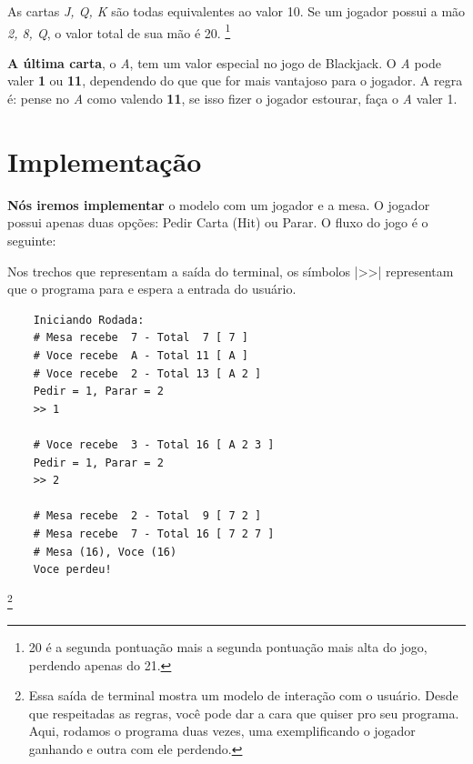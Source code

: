 \documentclass[12pt]{article}
\newcommand{\code}[1]{\lstinline|#1|} %
\newcommand{\ita}[1]{\textit{#1}}  %
\newcommand{\bold}[1]{\textbf{#1}} %
\newcommand{\note}[1]{\footnote{#1}} %
\newcommand{\caps}[1]{\textbf{#1}} %
\begin{document}
As cartas \ita{J, Q, K} são todas equivalentes ao valor 10. Se um jogador possui a mão \ita{2, 8, Q}, o valor total de sua mão é 20. 
\note{20 é a segunda pontuação mais a segunda pontuação mais alta do jogo, perdendo apenas do 21.}

\caps{A última carta}, o \ita{A}, tem um valor especial no jogo de Blackjack. O \ita{A} pode valer \bold{1} ou \bold{11}, dependendo do que que for mais vantajoso para o jogador. A regra é: pense no \ita{A} como valendo \bold{11}, se isso fizer o jogador estourar, faça o \ita{A} valer 1.

\section{Implementação}
\caps{Nós iremos implementar} o modelo com um jogador e a mesa. O jogador possui apenas duas opções: Pedir Carta (Hit) ou Parar. O fluxo do jogo é o seguinte:



Nos trechos que representam a saída do terminal, os símbolos \code|>>| representam que o programa para e espera a entrada do usuário.

\begin{mdframed}[nobreak=true]
	
	\begin{verbatim}
	Iniciando Rodada:
	# Mesa recebe  7 - Total  7 [ 7 ]
	# Voce recebe  A - Total 11 [ A ]
	# Voce recebe  2 - Total 13 [ A 2 ]
	Pedir = 1, Parar = 2 
	>> 1
	
	# Voce recebe  3 - Total 16 [ A 2 3 ]
	Pedir = 1, Parar = 2 
	>> 2
	
	# Mesa recebe  2 - Total  9 [ 7 2 ]
	# Mesa recebe  7 - Total 16 [ 7 2 7 ]
	# Mesa (16), Voce (16)
	Voce perdeu!
	\end{verbatim}
\end{mdframed}

\note{Essa saída de terminal mostra um modelo de interação com o usuário. Desde que respeitadas as regras, você pode dar 
	a cara que quiser pro seu programa. Aqui, rodamos o programa duas vezes, uma exemplificando o jogador ganhando e outra com ele perdendo.}
\end{document}
